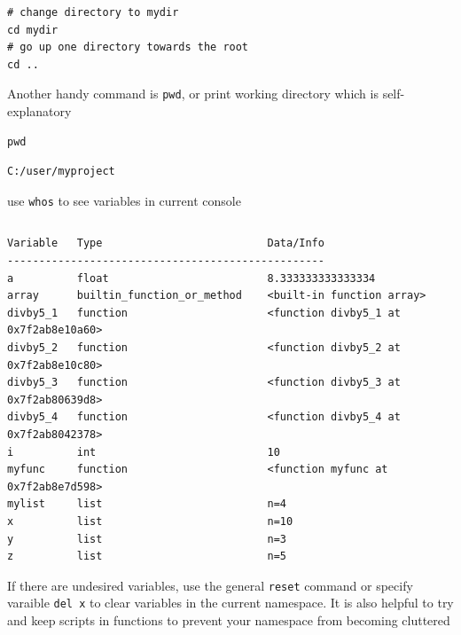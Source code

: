 \documentclass[%
oneside,                 %
final,                   %
10pt]{article}
\begin{document}
\begin{Verbatim}[numbers=none,fontsize=\fontsize{9pt}{9pt},baselinestretch=0.95,xleftmargin=2mm]
# change directory to mydir
cd mydir
# go up one directory towards the root
cd ..
\end{Verbatim}

Another handy command is \texttt{pwd}, or print working directory which is self-explanatory
\begin{Verbatim}[numbers=none,fontsize=\fontsize{9pt}{9pt},baselinestretch=0.95,xleftmargin=2mm]
pwd
\end{Verbatim}

\begin{Verbatim}[numbers=none,fontsize=\fontsize{9pt}{9pt},baselinestretch=0.95,xleftmargin=2mm]
C:/user/myproject
\end{Verbatim}

use \texttt{whos} to see variables in current console

\begin{Verbatim}[numbers=none,fontsize=\fontsize{9pt}{9pt},baselinestretch=0.95,xleftmargin=2mm]
%whos
\end{Verbatim}

\begin{Verbatim}[numbers=none,fontsize=\fontsize{9pt}{9pt},baselinestretch=0.95,xleftmargin=2mm]
Variable   Type                          Data/Info
--------------------------------------------------
a          float                         8.333333333333334
array      builtin_function_or_method    <built-in function array>
divby5_1   function                      <function divby5_1 at 0x7f2ab8e10a60>
divby5_2   function                      <function divby5_2 at 0x7f2ab8e10c80>
divby5_3   function                      <function divby5_3 at 0x7f2ab80639d8>
divby5_4   function                      <function divby5_4 at 0x7f2ab8042378>
i          int                           10
myfunc     function                      <function myfunc at 0x7f2ab8e7d598>
mylist     list                          n=4
x          list                          n=10
y          list                          n=3
z          list                          n=5
\end{Verbatim}

If there are undesired variables, use the general \texttt{reset} command or specify varaible \texttt{del x} to clear variables in the current namespace. It is also helpful to try and keep scripts in functions to prevent your namespace from becoming cluttered
\end{document}
